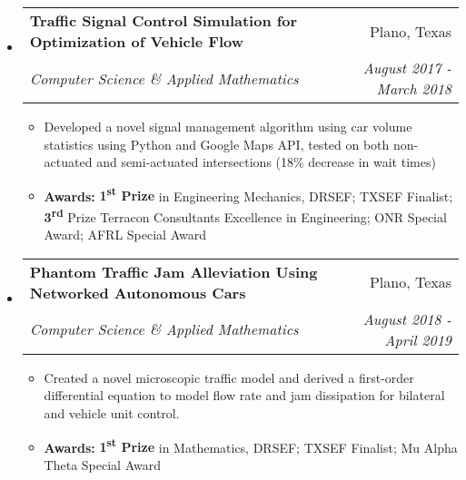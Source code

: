 \documentclass[letterpaper,11pt]{article}
\makeatletter
\newcommand{\resitem}[1]{\item #1 \vspace{-3pt}}
\newcommand{\ressubheading}[4]{
	\begin{tabular*}{7.0in}{l@{\extracolsep{\fill}}r}
			#1 & #2 \\
			\textit{#3} & \textit{#4}
	\end{tabular*}\vspace{-6pt}
}
\makeatother
\begin{document}
\begin{itemize}[leftmargin=*]

	\item
		\ressubheading{\textbf{Traffic Signal Control Simulation for Optimization of Vehicle Flow}}{Plano, Texas}{Computer Science \& Applied Mathematics}{August 2017 - March 2018}
			\begin{itemize}[leftmargin=*]
				\resitem{Developed a novel signal management algorithm using car volume statistics using Python and Google Maps API, tested on both non-actuated and semi-actuated intersections (18\% decrease in wait times)}
				\resitem{\textbf{Awards:} \textbf{1\textsuperscript{st} Prize} in Engineering Mechanics, DRSEF; TXSEF Finalist; \textbf{3\textsuperscript{rd}} Prize Terracon Consultants Excellence in Engineering; ONR Special Award; AFRL Special Award}
			\end{itemize}
	\item
		\ressubheading{\textbf{Phantom Traffic Jam Alleviation Using Networked Autonomous Cars}}{Plano, Texas}{Computer Science \& Applied Mathematics}{August 2018 - April 2019}
			\begin{itemize}[leftmargin=*]
				\resitem{Created a novel microscopic traffic model and derived a first-order differential equation to model flow rate and jam dissipation for bilateral and vehicle unit control.}
				\resitem{\textbf{Awards:} \textbf{1\textsuperscript{st} Prize} in Mathematics, DRSEF; TXSEF Finalist; Mu Alpha Theta Special Award}
			\end{itemize}


	
\end{itemize}
\end{document}

